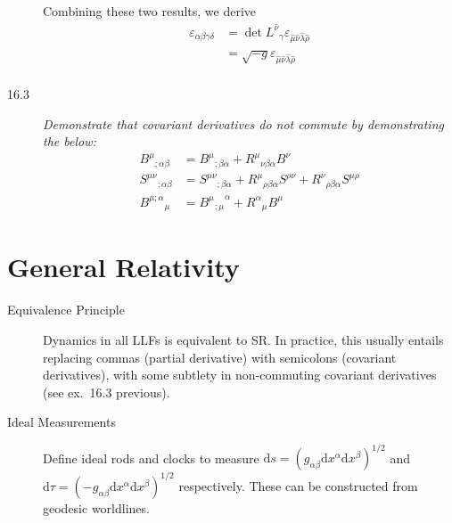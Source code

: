 \documentclass[12pt]{report}
\begin{document}
\begin{description}
        Combining these two results, we derive
        \begin{align*}
            \varepsilon_{\alpha\beta\gamma\delta} &=
                \det {L^{\hat{\nu}}}_{\gamma}
                \varepsilon_{\hat{\mu}\hat{\nu}\hat{\lambda}\hat{\rho}}\\
                &= \sqrt{-g}
                \varepsilon_{\hat{\mu}\hat{\nu}\hat{\lambda}\hat{\rho}}\\
        \end{align*}

    \item[16.3] \emph{Demonstrate that covariant derivatives do not commute by
        demonstrating the below:}
        \begin{align*}
            {B^\mu}_{;\alpha\beta} &= {B^\mu}_{;\beta\alpha} +
                {R^\mu}_{\nu\beta\alpha} B^\nu\\
            {S^{\mu\nu}}_{;\alpha\beta} &= {S^{\mu\nu}}_{;\beta\alpha} +
                {R^\mu}_{\rho\beta\alpha}S^{\rho\nu} +
                {R^\nu}_{\rho\beta\alpha}S^{\mu\rho}\\
            {B^{\mu;\alpha}}_\mu &= {{B^\mu}_{;\mu}}^\alpha +
                {R^\alpha}_\mu B^\mu
        \end{align*}
\end{description}

\section{General Relativity}

\begin{description}
    \item[Equivalence Principle] Dynamics in all LLFs is equivalent to SR\@. In
        practice, this usually entails replacing commas (partial derivative)
        with semicolons (covariant derivatives), with some subtlety in
        non-commuting covariant derivatives (see ex.\ 16.3 previous).

    \item[Ideal Measurements] Define ideal rods and clocks to measure
        $\mathrm{d}s = (g_{\alpha\beta}\mathrm{d}x^\alpha
        \mathrm{d}x^\beta)^{1/2}$ and
        $\mathrm{d}\tau = (-g_{\alpha\beta}\mathrm{d}x^\alpha
        \mathrm{d}x^\beta)^{1/2}$ respectively. These can be constructed from
        geodesic worldlines.
\end{description}
\end{document}
